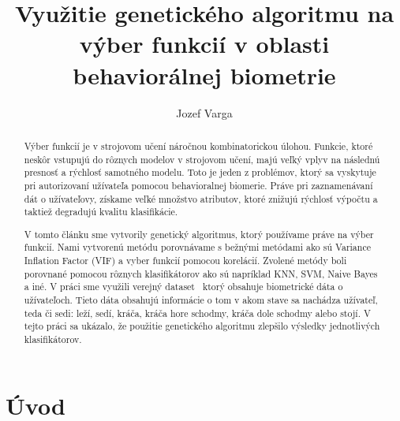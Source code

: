 \documentclass[runningheads]{llncs}
\begin{document}
%
\title{Využitie genetického algoritmu na výber funkcií v oblasti behaviorálnej biometrie}
%
%
\author{Jozef Varga}
%
%
\maketitle              %
%
\begin{abstract}
    Výber funkcií je v strojovom učení náročnou kombinatorickou úlohou. 
    Funkcie, ktoré neskôr vstupujú do rôznych modelov v strojovom učení, majú
    veľký vplyv na následnú presnosť a rýchlosť samotného modelu. Toto je jeden z problémov,
    ktorý sa vyskytuje pri autorizovaní užívateľa pomocou behavioralnej biomerie. Práve pri
    zaznamenávaní dát o užívateľovy, získame veľké množstvo atributov, ktoré znižujú rýchlosť výpočtu
    a taktiež degradujú kvalitu klasifikácie. 
    
    V tomto článku sme vytvorily genetický algoritmus, ktorý používame práve na výber funkcií. Nami vytvorenú
    metódu porovnávame s bežnými metódami ako sú Variance Inflation Factor (VIF) a vyber funkcií pomocou korelácií. 
    Zvolené metódy boli porovnané pomocou rôznych klasifikátorov ako sú napríklad KNN, SVM, Naive Bayes a iné. 
    V práci sme využili verejný dataset~\cite{ref_dataset_anguita,ref_dataset} ktorý obsahuje biometrické dáta o užívateľoch. Tieto dáta obsahujú informácie o tom v akom stave sa nachádza užívateľ, teda či sedi: leží, sedí, kráča,  kráča hore schodmy, kráča dole schodmy alebo stojí.
    V tejto práci sa ukázalo, že použitie genetického algoritmu zlepšilo výsledky jednotlivých klasifikátorov.

\end{abstract}
%

\section{Úvod}
\end{document}
